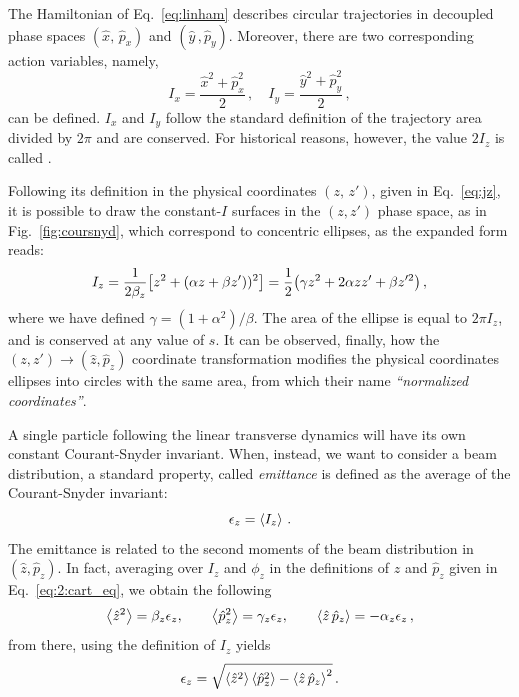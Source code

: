 The Hamiltonian of Eq.~\eqref{eq:linham} describes circular trajectories in decoupled phase spaces $(\hat x,\,\hat p_x)$ and $(\hat y\,, \hat p_y)$. Moreover, there are two corresponding action variables, namely,
\begin{equation}
    I_x = \frac{\hat x^2 +\hat p_x^2}{2}\,, \quad I_y=\frac{\hat y^2+\hat p_y^2}{2} \,,
\end{equation}
can be defined. $I_x$ and $I_y$ follow the standard definition of the trajectory area divided by $2\pi$ and are conserved. For historical reasons, however, the value $2I_z$ is called .

Following its definition in the physical coordinates $(z,\, z')$, given in Eq.~\eqref{eq:jz}, it is possible to draw the constant-$I$ surfaces in the $(z,z')$ phase space, as in Fig.~\ref{fig:coursnyd}, which correspond to concentric ellipses, as the expanded form reads:
%
\begin{equation}
I_z = \frac{1}{2\beta_z}\qty[z^2 + (\alpha z + \beta z'))^2] = \frac{1}{2}\qty(\gamma z^2 + 2\alpha z z' + \beta z'^2)\,, \end{equation}
%
where we have defined $\gamma=(1+\alpha^2)/\beta$. The area of the ellipse is equal to $2\pi I_z$, and is conserved at any value of $s$. It can be observed, finally, how the $(z,z')\to(\hat z,\hat p_z)$ coordinate transformation modifies the physical coordinates ellipses into circles with the same area, from which their name \textit{``normalized coordinates''}.

A single particle following the linear transverse dynamics will have its own constant Courant-Snyder invariant. When, instead, we want to consider a beam distribution, a standard property, called \textit{emittance} is defined as the average of the Courant-Snyder invariant:
\begin{equation}
    \epsilon_z = \left<{I_z}\right> \,.
\end{equation}
The emittance is related to the second moments of the beam distribution in $(\hat z,\hat p_z)$. In fact, averaging over $I_z$ and $\phi_z$ in the definitions of $\hat z$ and $\hat p_z$ given in Eq.~\eqref{eq:2:cart_eq}, we obtain the following
%
\begin{equation}
	\left<{\hat z^2}\right> = \beta_z \epsilon_z, \qquad \left<{\hat p_z^2}\right>=\gamma_z \epsilon_z, \qquad \left<{\hat z\,\hat p_z}\right>=-\alpha_z\epsilon_z\,,
\end{equation}
%
from there, using the definition of $I_z$ yields
\begin{equation}
	\epsilon_z = \sqrt{ \left<{\hat z^2}\right>\left<{\hat p_z^2}\right> - \left<{\hat z \, \hat p_z}\right>^2 }\,.
\end{equation}

